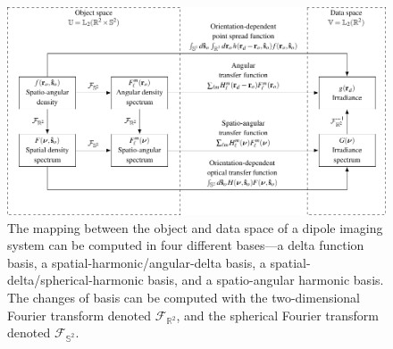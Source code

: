 \documentclass[]{osa-article}
\providecommand{\mbb}[1]{\mathbb{#1}}
\begin{document}
  \begin{figure}
  \hspace{-5em}
  \includegraphics[scale=1.0]{../figures/dipole-block/dipole-block.pdf}
  \caption{The mapping between the object and data space of a dipole imaging
    system can be computed in four different bases---a delta function basis, a
    spatial-harmonic/angular-delta basis, a spatial-delta/spherical-harmonic
    basis, and a spatio-angular harmonic basis. The changes of basis can be
    computed with the two-dimensional Fourier transform denoted
    $\mathcal{F}_{\mbb{R}^2}$, and the spherical Fourier transform denoted
    $\mathcal{F}_{\mbb{S}^2}$.}
   \label{fig:dipole-block}      
    \end{figure}
\end{document}
